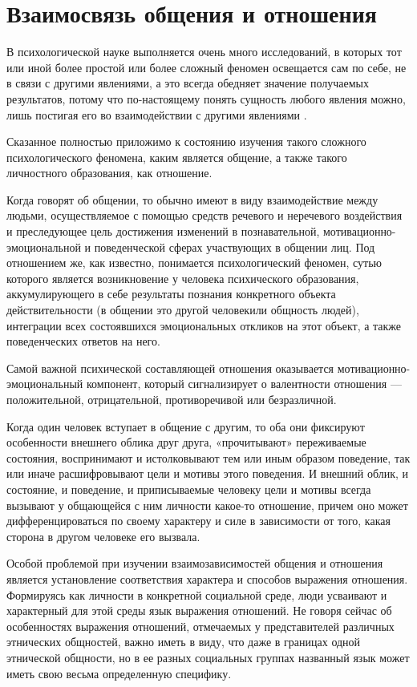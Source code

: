\chapter{Взаимосвязь общения и отношения}
В психологической науке выполняется очень много исследований, в которых тот или иной более простой или более сложный феномен освещается сам по себе, не в связи с другими явлениями, а это всегда обедняет значение получаемых результатов, потому что по-настоящему понять сущность любого явления можно, лишь постигая его во взаимодействии с другими явлениями \cite{17}. 

Сказанное полностью приложимо к состоянию изучения такого сложного психологического феномена, каким является общение, а также такого личностного образования, как отношение. 

Когда говорят об общении, то обычно имеют в виду взаимодействие между людьми, осуществляемое с помощью средств речевого и неречевого воздействия и преследующее цель достижения изменений в познавательной, мотивационно-эмоциональной и поведенческой сферах участвующих в общении лиц. Под отношением же, как известно, понимается психологический феномен, сутью которого является возникновение у человека психического образования, аккумулирующего в себе результаты познания конкретного объекта действительности (в общении это другой человекили общность людей), интеграции всех состоявшихся эмоциональных откликов на этот объект, а также поведенческих ответов на него. 

Самой важной психической составляющей отношения оказывается мотивационно-эмоциональный компонент, который сигнализирует о валентности отношения — положительной, отрицательной, противоречивой или безразличной.

Когда один человек вступает в общение с другим, то оба они фиксируют особенности внешнего облика друг друга, «прочитывают» переживаемые состояния, воспринимают и истолковывают тем или иным образом поведение, так или иначе расшифровывают цели и мотивы этого поведения. И внешний облик, и состояние, и поведение, и приписываемые человеку цели и мотивы всегда вызывают у общающейся с ним личности какое-то отношение, причем оно может дифференцироваться по своему характеру и силе в зависимости от того, какая сторона в другом человеке его вызвала. 

Особой проблемой при изучении взаимозависимостей общения и отношения является установление соответствия характера и способов выражения отношения. Формируясь как личности в конкретной социальной среде, люди усваивают и характерный для этой среды язык выражения отношений. Не говоря сейчас об особенностях выражения отношений, отмечаемых у представителей различных этнических общностей, важно иметь в виду, что даже в границах одной этнической общности, но в ее разных социальных группах названный язык может иметь свою весьма определенную специфику.

